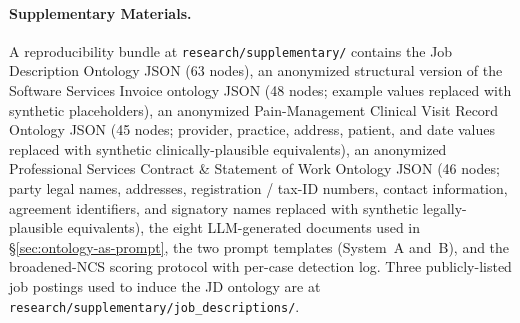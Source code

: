 \documentclass[runningheads,a4paper]{llncs}
\begin{document}
\paragraph{Supplementary Materials.}\sloppy A reproducibility bundle at
\texttt{research/supplementary/} contains the Job Description
Ontology JSON (63 nodes), an anonymized structural version of
the Software Services Invoice ontology JSON (48 nodes; example
values replaced with synthetic placeholders), an anonymized
Pain-Management Clinical Visit Record Ontology JSON (45 nodes;
provider, practice, address, patient, and date values replaced with
synthetic clinically-plausible equivalents), an anonymized
Professional Services Contract \& Statement of Work Ontology JSON
(46 nodes; party legal names, addresses, registration / tax-ID
numbers, contact information, agreement identifiers, and signatory
names replaced with synthetic legally-plausible equivalents), the
eight LLM-generated documents used in
\S\ref{sec:ontology-as-prompt}, the two prompt templates (System~A
and~B), and the broadened-NCS
scoring protocol with per-case detection log. Three publicly-listed
job postings used to induce the JD ontology are at
\texttt{research/supplementary/job\_descriptions/}.\par
\end{document}
